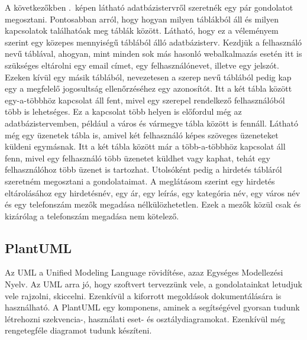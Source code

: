 \documentclass[]{thesis-ekf}
\theoremstyle{definition}
\theoremstyle{remark}
\begin{document}
	A következőkben .~képen látható adatbázistervről szeretnék egy pár gondolatot megosztani. Pontosabban arról, hogy hogyan milyen táblákból áll és milyen kapcsolatok találhatóak meg táblák között. Látható, hogy ez a véleményem szerint egy közepes mennyiségű táblából álló adatbázisterv. Kezdjük a felhasználó nevű táblával, ahogyan, mint minden sok más hasonló webalkalmazás esetén itt is szükséges eltárolni egy email címet, egy felhasználónevet, illetve egy jelszót. Ezeken kívül egy másik táblából, nevezetesen a szerep nevű táblából pedig kap egy a megfelelő jogosultság ellenőrzéséhez egy azonosítót. Itt a két tábla között egy-a-többhöz kapcsolat áll fent, mivel egy szerepel rendelkező felhasználóból több is lehetséges. Ez a kapcsolat több helyen is előfordul még az adatbázistervemben, például a város és vármegye tábla között is fennáll. Látható még egy üzenetek tábla is, amivel két felhasználó képes szöveges üzeneteket küldeni egymásnak. Itt a két tábla között már a több-a-többhöz kapcsolat áll fenn, mivel egy felhasználó több üzenetet küldhet vagy kaphat, tehát egy felhasználóhoz több üzenet is tartozhat. Utolsóként pedig a hirdetés tábláról szeretném megosztani a gondolataimat. A meglátásom szerint egy hirdetés eltárolásához egy hirdetésnév, egy ár, egy leírás, egy kategória név, egy város név és egy telefonszám mezők megadása nélkülözhetetlen. Ezek a mezők közül csak és kizárólag a telefonszám megadása nem kötelező. 
	
	\subsection{PlantUML}\label{sc-plantuml}
	Az UML a Unified Modeling Language rövidítése, azaz Egységes Modellezési Nyelv. Az UML arra jó, hogy szoftvert tervezzünk vele, a gondolatainkat letudjuk vele rajzolni, skiccelni. Ezenkívül a kiforrott megoldások dokumentálására is használható. A PlantUML egy komponens, aminek a segítségével gyorsan tudunk létrehozni szekvencia-, használati eset- és osztálydiagramokat. Ezenkívül még rengetegféle diagramot tudunk készíteni. \cite{PlantUML}
	
\end{document}
